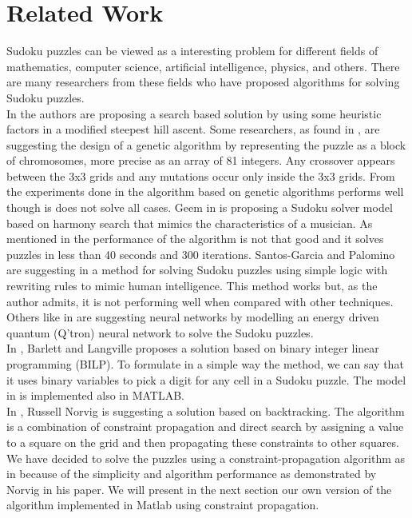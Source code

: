 \documentclass[12pt,a4paper]{article} %
\begin{document}
\section{Related Work}
Sudoku puzzles can be viewed as a interesting problem for different fields of mathematics, computer science, artificial intelligence, physics, and others. There are many researchers from these fields who have proposed algorithms for solving Sudoku puzzles. 
\newline
\\ In \cite{jones2008construction} the authors are proposing a search based solution by using some heuristic factors in a modified steepest hill ascent. Some researchers, as found in \cite{mantere2007solving}, are suggesting the design of a genetic algorithm by representing the puzzle as a block of chromosomes, more precise as an array of 81 integers. Any crossover appears between the 3x3 grids and any mutations occur only inside the 3x3 grids. From the experiments done in \cite{mantere2007solving} the algorithm based on genetic algorithms performs well though is does not solve all cases. Geem in \cite{geem2008harmony} is proposing a Sudoku solver model based on harmony search that mimics the characteristics of a musician. As mentioned in \cite{green2009survey} the performance of the algorithm is not that good and it solves puzzles in less than 40 seconds and 300 iterations. Santos-Garcia and Palomino are suggesting in \cite{santos2007solving} a method for solving Sudoku puzzles using simple logic with rewriting rules to mimic human intelligence. This method works but, as the author admits, it is not performing well when compared with other techniques. Others like in \cite{yue2006sudoku} are suggesting neural networks by modelling an energy driven quantum (Q'tron) neural network to solve the Sudoku puzzles. 
\newline
\\ In \cite{bartlett2006integer}, Barlett and Langville proposes a solution based on binary integer linear programming (BILP). To formulate in a simple way the method, we can say that it uses binary variables to pick a digit for any cell in a Sudoku puzzle. The model in \cite{bartlett2006integer} is implemented also in MATLAB.
\newline
\\ In \cite{norvigsolving}, Russell Norvig is suggesting a solution based on backtracking. The algorithm is a combination of constraint propagation and direct search by assigning a value to a square on the grid and then propagating these constraints to other squares.
\newline
\\ We have decided to solve the puzzles using a constraint-propagation algorithm as in \cite{norvigsolving} because of the simplicity and algorithm performance as demonstrated by Norvig in his paper. We will present in the next section our own version of the algorithm implemented in Matlab using constraint propagation.
\end{document}
